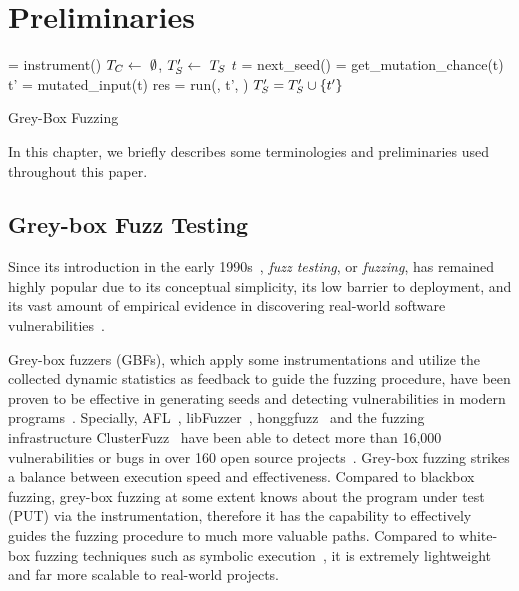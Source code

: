 \chapter{Preliminaries} \label{ch:preliminaries}

\begin{algorithm}[t]
 \small
{}
	\Prog = instrument(\ProgO) 
	$T_{C} \leftarrow~\emptyset$, $T^{\prime}_{S} \leftarrow~T_{S}$\; 
	 {
		$t$ = next\_seed(\FinalSeeds) 
		\mutChance = get\_mutation\_chance(t)  \label{line:algo:energy}
		 {
			t' = mutated\_input(t)  
			res = run(\Prog, t', \Ncal)
			 {\label{line:algo:new_cov}
				$T^{\prime}_{S} = T^{\prime}_{S}\cup\{t'\}$  \label{line:algo:triage_end}
			}
		}
	}
	\caption{Grey-Box Fuzzing}\label{algo:gbf}
\end{algorithm}

In this chapter, we briefly describes some terminologies and preliminaries used throughout this paper.

\section{Grey-box Fuzz Testing}\label{sec:intro-gbf}
Since its introduction in the early 1990s~\cite{fuzzing1990}, \emph{fuzz testing}, or \emph{fuzzing}, has remained highly popular due to its conceptual simplicity, its low barrier to deployment, and its vast amount of empirical evidence in discovering real-world software vulnerabilities~\cite{fuzz_survey}.

Grey-box fuzzers (GBFs), which apply some instrumentations and utilize the collected dynamic statistics as feedback to guide the fuzzing procedure, have been proven to be effective in generating seeds and detecting vulnerabilities in modern programs~\cite{fuzz_survey}. Specially, AFL~\cite{afl}, libFuzzer~\cite{libfuzzer}, honggfuzz~\cite{honggfuzz} and the fuzzing infrastructure ClusterFuzz~\cite{clusterfuzz} have been able to detect more than 16,000 vulnerabilities or bugs in over 160 open source projects~\cite{afl,clusterfuzz}. Grey-box fuzzing strikes a balance between execution speed and effectiveness. Compared to blackbox fuzzing, grey-box fuzzing at some extent knows about the program under test (PUT) via the instrumentation, therefore it has the capability to effectively guides the fuzzing procedure to much more valuable paths. Compared to white-box fuzzing techniques such as symbolic execution~\cite{dart,klee}, it is extremely lightweight and far more scalable to real-world projects.



